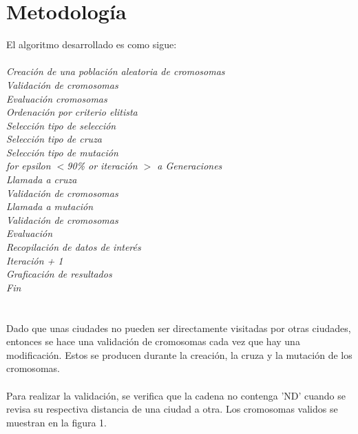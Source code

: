 \documentclass[10pt,letterpaper]{article}
\begin{document}
\section{Metodología}
El algoritmo desarrollado es como sigue:
\\\\
\hrulefill \textit{Creación de una población aleatoria de cromosomas} \\
\hspace*{1cm}\textit{Validación de cromosomas}\\
\textit{Evaluación cromosomas}\\
\textit{Ordenación por criterio elitista}\\
\textit{Selección tipo de selección}\\
\textit{Selección tipo de cruza}\\
\textit{Selección tipo de mutación}\\
\textit{for epsilon $<$90\% or iteración $>$ a Generaciones}\\
\hspace*{1cm}\textit{Llamada a cruza}	\\
\hspace*{2cm}\textit{Validación de cromosomas}\\
\hspace*{1cm}\textit{Llamada a mutación}	\\
\hspace*{2cm}\textit{Validación de cromosomas}\\
\hspace*{1cm}\textit{Evaluación}	\\
\hspace*{1cm}\textit{Recopilación de datos de interés}	\\
\hspace*{1cm}\textit{Iteración + 1}	\\
\textit{Graficación de resultados}\\
\textit{Fin}\\
\\\\
Dado que unas ciudades no pueden ser directamente visitadas por otras ciudades, entonces se hace una validación de cromosomas cada vez que hay una modificación. Estos se producen durante la creación, la cruza y la mutación de los cromosomas.
\\\\
Para realizar la validación, se verifica que la cadena no contenga 'ND' cuando se revisa su respectiva distancia de una ciudad a otra. Los cromosomas validos se muestran en la figura 1.
\end{document}
